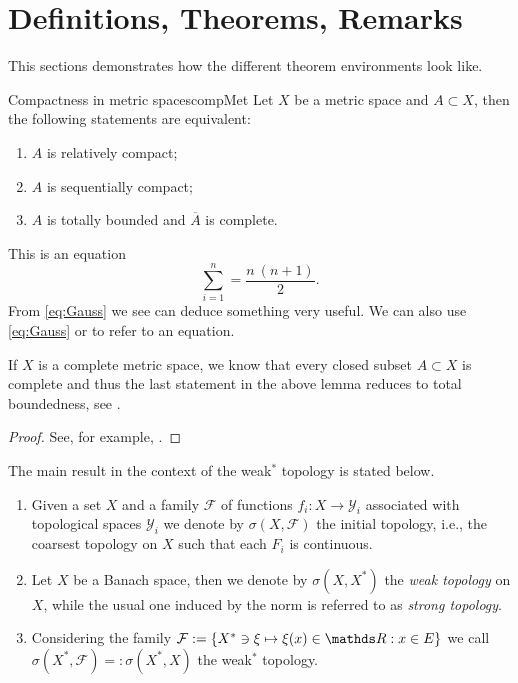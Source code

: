 \section{Definitions, Theorems, Remarks}
This sections demonstrates how the different theorem environments look like.
\begin{lemma}{Compactness in metric spaces}{compMet}
Let $X$ be a metric space and $A\subset X$, then the following statements are equivalent:
\begin{enumerate}[label=(\roman*)]
\item $A$ is relatively compact;
\item $A$ is sequentially compact;
\item $A$ is totally bounded and $\overline A$ is complete.
\end{enumerate}	
\end{lemma}
This is an equation
\begin{equation}\label{eq:Gauss}
\sum_{i=1}^n=\frac{n~(n+1)}{2}.
\end{equation}
From \ref{eq:Gauss} we see can deduce something very useful. 
We can also use \cref{eq:Gauss} or  to refer to an equation.
\begin{remark}{}{}
If $X$ is a complete metric space, we know that every closed subset $A\subset X$ is 
complete and thus the last statement in the above lemma reduces to total boundedness, 
see \cite[Lem. I.6.7]{Dunf60}.
\end{remark}
\begin{proof}
See, for example, \cite[Lem. I.6.15]{Dunf60}.
\end{proof}
The main result in the context of the weak$^\ast$ topology is stated below.
\begin{definition}{}{}
\begin{enumerate}[label=(\roman*)]
\item Given a set $X$ and a family $\mathcal{F}$ of functions $f_i:X\rightarrow \mathcal{Y}_i$ 
associated with topological spaces $\mathcal{Y}_i$ we denote by $\sigma(X,\mathcal{F})$ 
the initial topology, i.e., the coarsest topology on $X$ such that each $F_i$ is continuous.
\item Let $X$ be a Banach space, then we denote by $\sigma(X,X^{\ast})$ the 
\emph{weak topology} on $X$, while the usual one induced by the norm is referred to as 
\emph{strong topology}.
\item Considering the family $\mathcal{F}:=\{X^{\ast}\ni\xi\mapsto\xi(x)\in\R: x\in E\}$ 
we call $\sigma(X^{\ast}, \mathcal{F}) =:\sigma(X^{\ast},X)$ the weak$^\ast$ topology.
\end{enumerate}
\end{definition}
